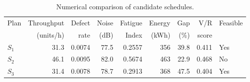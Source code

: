 \begin{table}[htbp]
\centering
\caption{Numerical comparison of candidate schedules.}
\label{tab:numerical-sim}
\small
\begin{tabular}{@{}lrrrrrrrl@{}}
\toprule
Plan & Throughput & Defect & Noise & Fatigue & Energy & Gap & V/R & Feasible \\
     & (units/h)  & rate   & (dB)  & Index   & (kWh)  & (\%) & score &         \\
\midrule
$S_{1}$ & 31.3 & 0.0074 & 77.5 & 0.2557 & 356 & 39.8 & 0.411 & Yes \\
$S_{2}$ & 46.1 & 0.0095 & 82.0 & 0.5674 & 463 & 22.9 & 0.468 & No \\
$S_{3}$ & 31.4 & 0.0078 & 78.7 & 0.2913 & 368 & 47.5 & 0.404 & Yes \\
\bottomrule
\end{tabular}
\end{table}
